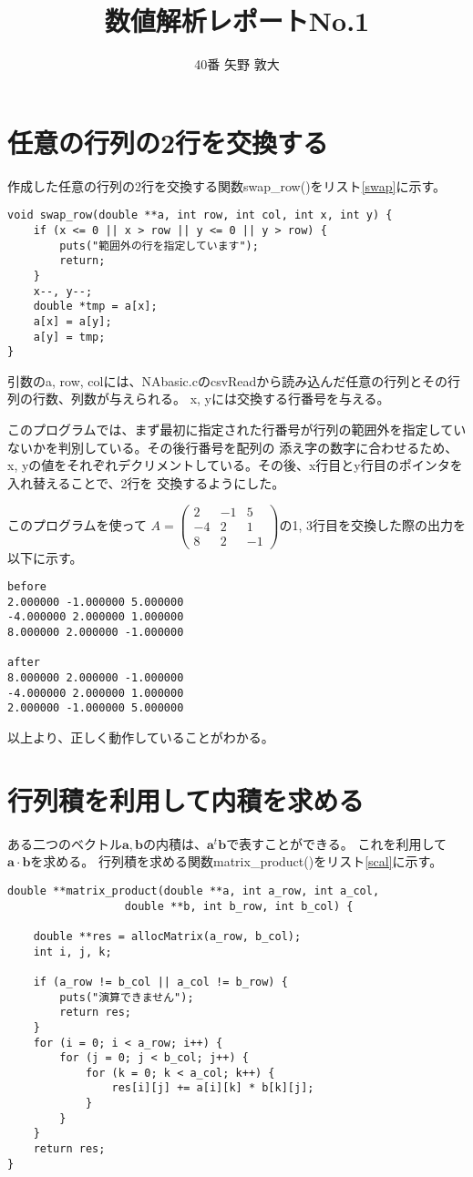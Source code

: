 \documentclass{jsarticle}
\title{数値解析レポートNo.1}
\author{40番 矢野 敦大}
\date{}
\begin{document}
\maketitle
    \section{任意の行列の2行を交換する}
	作成した任意の行列の2行を交換する関数swap\_row()をリスト\ref{swap}に示す。
	\begin{lstlisting}[caption=作成した関数swap\_row(), label=swap]
void swap_row(double **a, int row, int col, int x, int y) {
	if (x <= 0 || x > row || y <= 0 || y > row) {
		puts("範囲外の行を指定しています");
		return;
	}
	x--, y--;
	double *tmp = a[x];
	a[x] = a[y];
	a[y] = tmp;
}\end{lstlisting}

	引数のa, row, colには、NAbasic.cのcsvReadから読み込んだ任意の行列とその行列の行数、列数が与えられる。
	x, yには交換する行番号を与える。

	このプログラムでは、まず最初に指定された行番号が行列の範囲外を指定していないかを判別している。その後行番号を配列の
	添え字の数字に合わせるため、x, yの値をそれぞれデクリメントしている。その後、x行目とy行目のポインタを入れ替えることで、2行を
	交換するようにした。

	このプログラムを使って $
            A = \left(
                \begin{array}{ccc}
                  2 & -1 & 5 \\
                  -4 & 2 & 1 \\
                  8 & 2 & -1
                \end{array}
            \right)
        $の1, 3行目を交換した際の出力を以下に示す。

\begin{verbatim}
before
2.000000 -1.000000 5.000000
-4.000000 2.000000 1.000000
8.000000 2.000000 -1.000000

after
8.000000 2.000000 -1.000000
-4.000000 2.000000 1.000000
2.000000 -1.000000 5.000000
\end{verbatim}
以上より、正しく動作していることがわかる。
    \section{行列積を利用して内積を求める}
	ある二つのベクトル$\bm{a}, \bm{b}$の内積は、$\bm{a}^t \bm{b}$で表すことができる。
	これを利用して$\bm{a}\cdot \bm{b}$を求める。
	行列積を求める関数matrix\_product()をリスト\ref{scal}に示す。
       \begin{lstlisting}[caption=作成した関数matrix\_product(), label=scal]
double **matrix_product(double **a, int a_row, int a_col,
        	      double **b, int b_row, int b_col) {

	double **res = allocMatrix(a_row, b_col);
	int i, j, k;

	if (a_row != b_col || a_col != b_row) {
		puts("演算できません");
		return res;
	}
	for (i = 0; i < a_row; i++) {
		for (j = 0; j < b_col; j++) {
			for (k = 0; k < a_col; k++) {
				res[i][j] += a[i][k] * b[k][j];
			}
		}
	}
	return res;
}\end{lstlisting}
\end{document}
